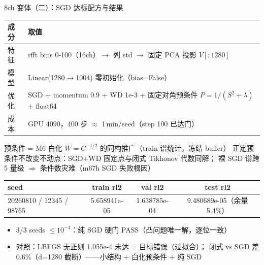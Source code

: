 \documentclass[aspectratio=169]{beamer}
\newcommand{\pos}[1]{\textcolor{blue!70!black}{#1}}
\newcommand{\con}[1]{\textcolor{orange!85!black}{#1}}
\newcommand{\HL}[1]{\textcolor{green!45!black}{#1}}
\begin{document}
\begin{frame}{8ch 变体（二）：SGD 达标配方与结果}
  \begin{table}
    \centering
    \footnotesize
    \begin{tabular}{ll}
      \toprule
      成分 & 取值 \\
      \midrule
      特征 & rfft bins 0-100（16ch）$\to$ 列 std $\to$ 固定 PCA 投影 $V[:1280]$ \\
      模型 & Linear(1280$\to$1004) \pos{零初始化}（bias=False） \\
      优化 & \pos{SGD + momentum 0.9 + WD 1e-3} + 固定对角预条件 $P=1/(S^2+\lambda)$ + float64 \\
      成本 & GPU 4090，400 步 $\approx$ 1\,min/seed（step 100 已达门） \\
      \bottomrule
    \end{tabular}
  \end{table}
  \begin{block}{\small 预条件 = M6 白化 $W=C^{-1/2}$ 的同构推广（train 谱统计，冻结 buffer）}
    \small 正定预条件不改变不动点：SGD+WD 固定点与闭式 Tikhonov \pos{代数同解}；
    裸 SGD 谱跨 5 量级 $\Rightarrow$ 条件数灾难（m67h SGD 失败根因）
  \end{block}
  \begin{table}
    \centering
    \footnotesize
    \begin{tabular}{lccc}
      \toprule
      seed & train rl2 & val rl2 & test rl2 \\
      \midrule
      20260810 / 12345 / 98765 & 5.658941e-05 & 1.638785e-04 & \HL{9.480689e-05（余量 5.4\%）} \\
      \bottomrule
    \end{tabular}
  \end{table}
  \begin{itemize}
    \item \HL{3/3 seeds $\le 10^{-4}$：纯 SGD 硬门 PASS（凸问题唯一解，逐位一致）}
    \item 对照：LBFGS 无正则 1.055e-4 未达 = \con{目标错误（过拟合）}；
      闭式 vs SGD 差 0.6\%（d=1280 截断）——\pos{小结构 + 白化预条件 + 纯 SGD}
  \end{itemize}
\end{frame}
\end{document}
